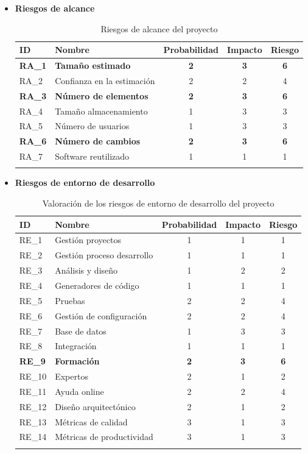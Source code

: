 \begin{enumerate}
\begin{itemize}
\item \textbf{Riesgos de alcance}
\begin{longtable}{l p{5cm} ccc}
\hline
\textbf{ID} & \textbf{Nombre} & \textbf{Probabilidad} & \textbf{Impacto} & \textbf{Riesgo} \\
\hline
\endhead
\endfoot
\textbf{RA\_1} & 
\textbf{Tamaño estimado} &
\textbf{2} &
\textbf{3} &
\textbf{6} 
 \\
RA\_2 & 
Confianza en la estimación &
2 &
2 &
4 
 \\
\textbf{RA\_3} & 
\textbf{Número de elementos} &
\textbf{2} &
\textbf{3} &
\textbf{6} 
 \\
RA\_4 & 
Tamaño almacenamiento &
1 &
3 &
3 
 \\
RA\_5 & 
Número de usuarios &
1 &
3 &
3 
 \\
\textbf{RA\_6} & 
\textbf{Número de cambios} &
\textbf{2} &
\textbf{3} &
\textbf{6} 
 \\
RA\_7 & 
Software reutilizado &
1 &
1 &
1 
 \\
\hline
\caption{Riesgos de alcance del proyecto}\label{ries_alcan}\\
\end{longtable}

\item \textbf{Riesgos de entorno de desarrollo}
\begin{longtable}{l p{5cm} ccc}
\hline
\textbf{ID} & \textbf{Nombre} & \textbf{Probabilidad} & \textbf{Impacto} & \textbf{Riesgo} \\
\hline
\endhead
\endfoot
RE\_1 & 
Gestión proyectos &
1 &
1 &
1 
 \\
RE\_2 & 
Gestión proceso desarrollo &
1 &
1 &
1 
 \\
RE\_3 & 
Análisis y diseño &
1 &
2 &
2 
 \\
RE\_4 & 
Generadores de código &
1 &
1 &
1 
 \\
RE\_5 & 
Pruebas &
2 &
2 &
4 
 \\
RE\_6 & 
Gestión de configuración &
2 &
2 &
4 
 \\
RE\_7 & 
Base de datos  &
1 &
3 &
3 
 \\
RE\_8 & 
Integración &
1 &
1 &
1 
 \\
\textbf{RE\_9} & 
\textbf{Formación} &
\textbf{2} &
\textbf{3} &
\textbf{6} 
 \\
RE\_10 & 
Expertos &
2 &
1 &
2 
 \\
RE\_11 & 
Ayuda online &
2 &
2 &
4 
 \\
RE\_12 & 
Diseño arquitectónico &
2 &
1 &
2 
 \\
RE\_13 & 
Métricas de calidad &
3 &
1 &
3 
 \\
RE\_14 & 
Métricas de productividad &
3 &
1 &
3 
\\
\hline
\caption{Valoración de los riesgos de entorno de desarrollo del proyecto}\label{ries_entorno_valoracion}\\
\end{longtable}


\end{itemize}
\end{enumerate}
